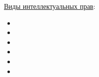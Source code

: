 \underline{Виды интеллектуальных прав}:\cite{wiki:IntelPrav}\\
\begin{itemize}
\item 
\item 
\item 
\item 
\item 
\item 
\end{itemize}
